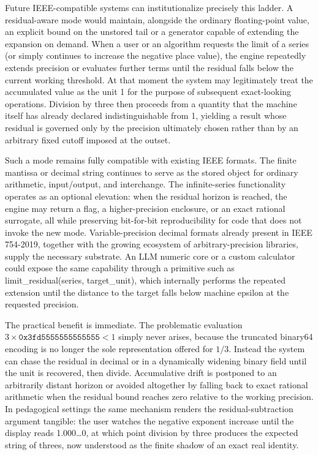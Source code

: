 Future IEEE-compatible systems can institutionalize precisely this ladder. A residual-aware mode would maintain, alongside the ordinary floating-point value, an explicit bound on the unstored tail or a generator capable of extending the expansion on demand. When a user or an algorithm requests the limit of a series (or simply continues to increase the negative place value), the engine repeatedly extends precision or evaluates further terms until the residual falls below the current working threshold. At that moment the system may legitimately treat the accumulated value as the unit 1 for the purpose of subsequent exact-looking operations. Division by three then proceeds from a quantity that the machine itself has already declared indistinguishable from 1, yielding a result whose residual is governed only by the precision ultimately chosen rather than by an arbitrary fixed cutoff imposed at the outset.

Such a mode remains fully compatible with existing IEEE formats. The finite mantissa or decimal string continues to serve as the stored object for ordinary arithmetic, input/output, and interchange. The infinite-series functionality operates as an optional elevation: when the residual horizon is reached, the engine may return a flag, a higher-precision enclosure, or an exact rational surrogate, all while preserving bit-for-bit reproducibility for code that does not invoke the new mode. Variable-precision decimal formats already present in IEEE 754-2019, together with the growing ecosystem of arbitrary-precision libraries, supply the necessary substrate. An LLM numeric core or a custom calculator could expose the same capability through a primitive such as limit_residual(series, target_unit), which internally performs the repeated extension until the distance to the target falls below machine epsilon at the requested precision.

The practical benefit is immediate. The problematic evaluation \(3\times\texttt{0x3fd5555555555555}<1\) simply never arises, because the truncated binary64 encoding is no longer the sole representation offered for \(1/3\). Instead the system can chase the residual in decimal or in a dynamically widening binary field until the unit is recovered, then divide. Accumulative drift is postponed to an arbitrarily distant horizon or avoided altogether by falling back to exact rational arithmetic when the residual bound reaches zero relative to the working precision. In pedagogical settings the same mechanism renders the residual-subtraction argument tangible: the user watches the negative exponent increase until the display reads 1.000\ldots0, at which point division by three produces the expected string of threes, now understood as the finite shadow of an exact real identity.


